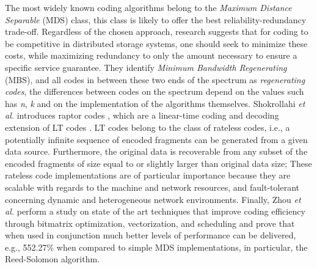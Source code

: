 \documentclass[runningheads]{llncs}
\begin{document}
The most widely known coding algorithms belong to the \textit{Maximum Distance Separable} (MDS) class, this class is likely to offer the best reliability-redundancy trade-off. Regardless of the chosen approach, research \cite{network-coding-for-dss} suggests that for coding to be competitive in distributed storage systems, one should seek to minimize these costs, while maximizing redundancy to only the amount necessary to ensure a specific service guarantee. They identify \textit{Minimum Bandwidth Regenerating} (MBS), and all codes in between these two ends of the spectrum as \textit{regenerating codes}, the differences between codes on the spectrum depend on the values such has \textit{n}, \textit{k} and on the implementation of the algorithms themselves. Shokrollahi \textit{et al.} introduces raptor codes \cite{raptor-codes}, which are a linear-time coding and decoding extension of LT codes \cite{lt-codes}. LT codes belong to the class of rateless codes, i.e., a potentially infinite sequence of encoded fragments can be generated from a given data source. Furthermore, the original data is recoverable from any subset of the encoded fragments of size equal to or slightly larger than original data size; These rateless code implementations are of particular importance because they are scalable with regards to the machine and network resources,  and fault-tolerant concerning dynamic and heterogeneous network environments. Finally, Zhou \textit{et al.} \cite{fast_coding} perform a study on state of the art techniques that improve coding efficiency through bitmatrix optimization, vectorization, and scheduling and prove that when used in conjunction much better levels of performance can be delivered, e.g., 552.27\% when compared to simple MDS implementations, in particular, the Reed-Solomon algorithm.
\end{document}

